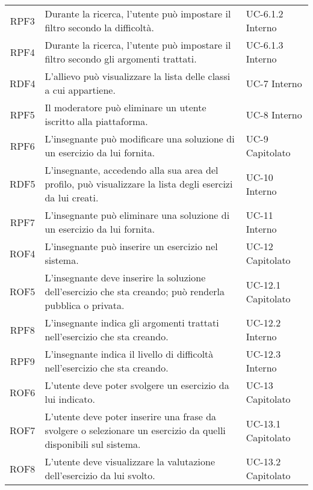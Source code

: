 \begin{tabularx}{\textwidth}{| c | p{10cm} | X |}
		RPF3 & Durante la ricerca, l'utente può impostare il filtro secondo la difficoltà. & UC-6.1.2 \newline Interno\\
		RPF4 & Durante la ricerca, l'utente può impostare il filtro secondo gli argomenti trattati. & UC-6.1.3 \newline Interno\\
		RDF4 & L'allievo può visualizzare la lista delle classi a cui appartiene. & UC-7 \newline Interno\\
		RPF5 & Il moderatore può eliminare un utente iscritto alla piattaforma. & UC-8 \newline Interno\\
		RPF6 & L'insegnante può modificare una soluzione di un esercizio da lui fornita. & UC-9 \newline Capitolato\\
		RDF5 & L'insegnante, accedendo alla sua area del profilo, può visualizzare la lista degli esercizi da lui creati. & UC-10 \newline Interno\\
		RPF7 & L'insegnante può eliminare una soluzione di un esercizio da lui fornita. & UC-11 \newline Interno\\
		ROF4 & L'insegnante può inserire un esercizio nel sistema. & UC-12 \newline Capitolato\\
		ROF5 & L'insegnante deve inserire la soluzione dell'esercizio che sta creando; può renderla pubblica o privata. & UC-12.1 \newline Capitolato\\
		RPF8 & L'insegnante indica gli argomenti trattati nell'esercizio che sta creando. & UC-12.2 \newline Interno\\
		RPF9 & L'insegnante indica il livello di difficoltà nell'esercizio che sta creando. & UC-12.3 \newline Interno\\
		ROF6 & L'utente deve poter svolgere un esercizio da lui indicato. & UC-13 \newline Capitolato\\
		ROF7 & L'utente deve poter inserire una frase da svolgere o selezionare un esercizio da quelli disponibili sul sistema. & UC-13.1 \newline Capitolato\\
		ROF8 & L'utente deve visualizzare la valutazione dell'esercizio da lui svolto. & UC-13.2 \newline Capitolato\\

\end{tabularx}
